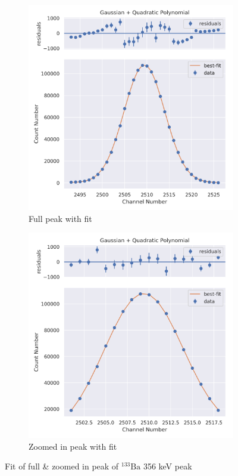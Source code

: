 \documentclass[11pt,a4paper]{article}
\newcommand{\element}[2]{$^{#2}\textrm{#1}$}
\begin{document}
\begin{figure}[H]
  \centering
  \begin{subfigure}{.5\linewidth}
    \centering
    \includegraphics[width=\linewidth]{./Images/Barium133/Quad/Quad_6_Full.png}
    \caption{Full peak with fit}
  \end{subfigure}%
  \begin{subfigure}{.5\linewidth}
    \centering
    \includegraphics[width=\linewidth]{./Images/Barium133/Quad/Quad_6_Zoom.png}
    \caption{Zoomed in peak with fit}
  \end{subfigure}
  \caption{Fit of full \& zoomed in peak of \element{Ba}{133} 356 keV peak}
\end{figure}
\end{document}
